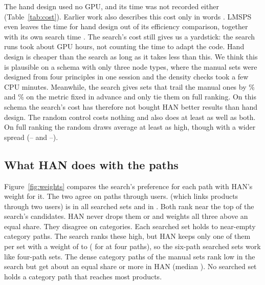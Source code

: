 The hand design used no GPU, and its time was not recorded either (Table~\ref{tab:cost}). Earlier
work also describes this cost only in words \citep[][App.~D]{han2020genetic,li2024longrange}. LMSPS
even leaves the time for hand design out of its efficiency comparison, together with its own search
time \citep[App.~E.1]{li2024longrange}. The search's cost still gives us a yardstick: the
 search runs took about  GPU hours, not counting the time
to adapt the code. Hand design is cheaper than the search as long as it takes less than this. We
think this is plausible on a schema with only three node types, where the manual sets were designed
from four principles in one session and the density checks took a few CPU minutes. Meanwhile, the
search gives sets that trail the manual ones by \% and
\% on the metric fixed in advance and only tie them on full ranking. On this
schema the search's cost has therefore not bought HAN better results than hand design. The random
control costs nothing and also does at least as well as both. On full ranking the random draws
average at least as high, though with a wider spread (--
and --).



\subsection{What HAN does with the paths}
\label{sec:res-weights}

Figure~\ref{fig:weights} compares the search's preference for each path with HAN's weight for it.
The two agree on paths through users.  (which links products through two users) is in
all  searched sets and  in . Both
rank near the top of the search's candidates. HAN never drops them or  and weights all
three above an equal share. They disagree on categories. Each searched set holds
 to  near-empty category paths. The search ranks
these high, but HAN keeps only one of them per set with a weight of  to
 ( for  at four paths), so the six-path
searched sets work like four-path sets. The dense category paths of the manual sets rank low in the
search but get about an equal share or more in HAN (median ). No searched set
holds a category path that reaches most products.


